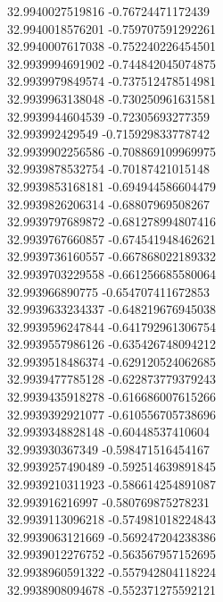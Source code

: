 {32.9940027519816	-0.76724471172439\\
32.9940018576201	-0.759707591292261\\
32.9940007617038	-0.752240226454501\\
32.9939994691902	-0.744842045074875\\
32.9939979849574	-0.737512478514981\\
32.9939963138048	-0.730250961631581\\
32.9939944604539	-0.72305693277359\\
32.993992429549	-0.715929833778742\\
32.9939902256586	-0.708869109969975\\
32.9939878532754	-0.70187421015148\\
32.9939853168181	-0.694944586604479\\
32.9939826206314	-0.68807969508267\\
32.9939797689872	-0.681278994807416\\
32.9939767660857	-0.674541948462621\\
32.9939736160557	-0.667868022189332\\
32.9939703229558	-0.661256685580064\\
32.993966890775	-0.654707411672853\\
32.9939633234337	-0.648219676945038\\
32.9939596247844	-0.641792961306754\\
32.9939557986126	-0.635426748094212\\
32.9939518486374	-0.629120524062685\\
32.9939477785128	-0.622873779379243\\
32.9939435918278	-0.616686007615266\\
32.9939392921077	-0.610556705738696\\
32.9939348828148	-0.60448537410604\\
32.993930367349	-0.598471516454167\\
32.9939257490489	-0.592514639891845\\
32.9939210311923	-0.586614254891087\\
32.993916216997	-0.580769875278231\\
32.9939113096218	-0.574981018224843\\
32.9939063121669	-0.569247204238386\\
32.9939012276752	-0.563567957152695\\
32.9938960591322	-0.557942804118224\\
32.9938908094678	-0.552371275592121\\
}
